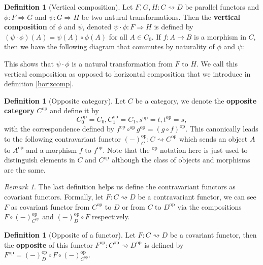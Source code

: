 \documentclass{scrartcl}
\theoremstyle{definition}
\newtheorem{defn}[thm]{Definition}
\theoremstyle{remark}
\newtheorem{rem}[thm]{Remark}
\newcommand{\op}[1]{#1^{\text{op}}}
\begin{document}
\begin{defn}[Vertical composition]
    Let $F,G,H: C\rightsquigarrow D$ be parallel functors and $\phi:F\Rightarrow G$ and $\psi:G\Rightarrow H$ be two natural transformations. Then the \textbf{vertical composition} of $\phi$ and $\psi$, denoted $\psi\cdot \phi:F\Rightarrow H$ is defined by $(\psi \cdot \phi)(A) = \psi(A) \circ \phi(A)$ for all $A \in C_0$. If $f: A\rightarrow B$ is a morphism in $C$, then we have the following diagram that commutes by naturality of $\phi$ and $\psi$:
    \begin{figure}[h]
        \centering
    \end{figure}
    
    This shows that $\psi \cdot \phi$ is a natural transformation from $F$ to $H$. We call this vertical composition as opposed to horizontal composition that we introduce in definition \ref{horizcomp}. 
\end{defn}
\begin{defn}[Opposite category]
    Let $C$ be a category, we denote the \textbf{opposite category} $\op{C}$ and define it by 
    \[ \op{C}_0 = C_0, \op{C}_1 = C_1, \op{s} = t, \op{t} = s,\]
    with the correspondence defined by $\op{f}\op{\circ}\op{g} = \op{(g\circ f)}$. This canonically leads to the following contravariant functor $\op{(-)}_C: C \rightsquigarrow \op{C}$ which sends an object $A$ to $\op{A}$ and a morphism $f$ to $\op{f}$. Note that the $\op{}$ notation here is just used to distinguish elements in $C$ and $\op{C}$ although the class of objects and morphisms are the same.
\end{defn}
\begin{rem}
    The last definition helps us define the contravariant functors as covariant functors. Formally, let $F:C\rightsquigarrow D$ be a contravariant functor, we can see $F$ as covariant functor from $\op{C}$ to $D$ or from $C$ to $\op{D}$ via the compositions $F\circ \op{(-)}_{\op{C}}$ and $\op{(-)}_{D}\circ F$ respectively.
\end{rem}
\begin{defn}[Opposite of a functor]
    Let $F:C \rightsquigarrow D$ be a covariant functor, then the \textbf{opposite} of this functor $\op{F}: \op{C}\rightsquigarrow \op{D}$ is defined by $\op{F} =\op{(-)}_{D}\circ F\circ \op{(-)}_{\op{C}}$.
\end{defn}
\end{document}

